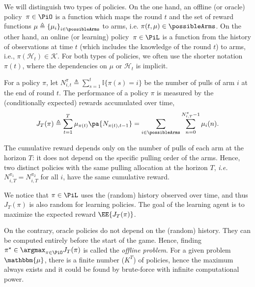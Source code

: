 We will distinguish two types of policies. On the one hand, an offline (or oracle) policy~$\pi \in \PiO$ is a function which maps the round $t$ and the set of reward functions $\mu \triangleq \left\{ \mu_i \right\}_{i \in \possibleArms}$ to arms, i.e. $\pi(t, \mu) \in \possibleArms$.  On the other hand, an online (or learning) policy~$\pi \in \PiL$ is a function from the history of observations at time $t$ (which includes the knowledge of the round $t$) to arms, i.e., $\pi(\mathcal{H}_t) \in \mathcal{K}$. For both types of policies, we often use the shorter notation $\pi(t)$, where the dependencies on $\mu$ or $\mathcal{H}_t$ is implicit. 

For a policy $\pi$, let $N_{i,t}^\pi \triangleq \sum_{s=1}^{t} \mathbb{I}\{\pi(s) = i\}$ be the number of pulls of arm $i$ at the end of round $t$. The performance of a policy $\pi$ is measured by the (conditionally expected) rewards accumulated over time, 
%
\begin{equation}
\label{eq:cumul-reward-rested}
J_T(\pi) \triangleq \sum_{t=1}^T \mu_{\pi(t)}\pa{N_{\pi(t),t-1}} = \sum_{i \in \possibleArms} \sum_{n=0}^{N_{i,T}^\pi-1} \mu_i(n).
\end{equation}
%
\begin{remark}
The cumulative reward depends only on the number of pulls of each arm at the horizon $T$: it does not depend on the specific pulling order of the arms. Hence, two distinct policies with the same pulling allocation at the horizon $T$, \emph{i.e.} $N_{i,T}^{\pi_1} = N_{i,T}^{\pi_2}$ for all $i$, have the same cumulative reward.
\end{remark}
%
We notice that $\pi \in \PiL$ uses the (random) history observed over time, and thus $J_T(\pi)$ is also random for learning policies. The goal of the learning agent is to maximize the expected reward $\EE{J_T(\pi)}$.

On the contrary,  oracle policies do not depend on the (random) history. They can be computed entirely before the start of the game. Hence, finding $\pi^\star \in \argmax_{\pi \in \PiO} J_T(\pi)$ is called the \textit{offline problem}. For a given problem $\mathbbm{\mu}$, there is a finite number ($K^T$) of policies, hence the maximum always exists and it could be found by brute-force with infinite computational power.

